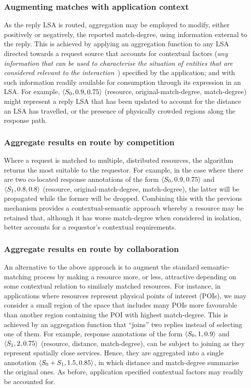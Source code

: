 \documentclass[12pt,a4paper,twoside,openright]{book}
\begin{document}
\subsubsection{Augmenting matches with application context}
As the reply LSA is routed, aggregation may be employed to modify, either positively or negatively, the reported match-degree, using information external to the reply.
%
This is achieved by applying an aggregation function to any LSA directed towards a request source that accounts for contextual factors (\emph{any information that can be used to characterise the situation of entities that are considered relevant to the interaction}~\cite{dey2001conceptual}) specified by the application; and with such information readily available for consumption through its expression in an LSA.
%
For example, $\langle S_0, 0.9, 0.75\rangle$ (resource, original-match-degree, match-degree) might represent a reply LSA that has been updated to account for the distance an LSA has travelled, or the presence of physically crowded regions along the response path. 

\subsubsection{Aggregate results en route by competition}
Where a request is matched to multiple, distributed resources, the algorithm returns the most suitable to the requestor.
%
For example, in the case where there are two co-located response annotations of the form $\langle S_0, 0.9, 0.75\rangle$ and $\langle S_1, 0.8, 0.8\rangle$ (resource, original-match-degree, match-degree), the latter will be propagated while the former will be dropped.
%
Combining this with the previous mechanism provides a contextual-semantic approach whereby a resource may be retained that, although it has worse match-degree when considered in isolation, better accounts for a requestor's contextual requirements.

\subsubsection{Aggregate results en route by collaboration}
An alternative to the above approach is to augment the standard semantic-matching process by making a resource more, or less, attractive depending on some contextual relation to similarly matched resources.
%
For instance, in applications where resources represent physical points of interest (POIs), we may consider a small region of the space that includes many POIs more favourable than another region containing the POI with highest match-degree. 
%
This is achieved by an aggregation function that ``joins'' two replies instead of selecting one of them. For example, response annotations of the form $\langle S_0, 1 , 0.9\rangle$ and $\langle S_1, 2, 0.75\rangle$ (resource, distance, match-degree), can be subject to joining as they represent spatially close services.
%
Hence, they are aggregated into a single annotation $\langle S_0+S_1, 1.5 , 0.85\rangle$, in which distance and match-degree summarise the original ones.
%
As before, application specified contextual factors may readily be accounted for.
\end{document}
